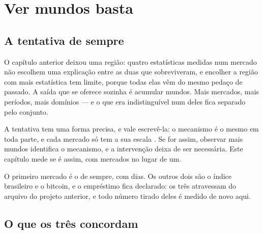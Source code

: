 %
%

\chapter{Ver mundos basta}
\label{cap:observar}

\section{A tentativa de sempre}

O capítulo anterior deixou uma região: quatro estatísticas medidas num mercado não escolhem uma
explicação entre as duas que sobreviveram, e encolher a região com mais estatística tem limite,
porque todas elas vêm do mesmo pedaço de passado. A saída que se oferece sozinha é acumular
mundos. Mais mercados, mais períodos, mais domínios --- e o que era indistinguível num deles fica
separado pelo conjunto.

A tentativa tem uma forma precisa, e vale escrevê-la: o mecanismo é o mesmo em toda parte, e cada
mercado só tem a sua escala \cite{peters2016causal}\cite{scholkopf2021causal}.\cite{ghassami2017learning}\cite{li2025feature}\cite{scholkopf2021causalb} Se for assim, observar mais mundos identifica o mecanismo, e a
intervenção deixa de ser necessária. Este capítulo mede se é assim, com \numObservarMercados{}
mercados no lugar de um.

O primeiro mercado é o de sempre, com \numObservarDiasMaior{} dias. Os outros dois são o índice
brasileiro e o bitcoin, e o empréstimo fica declarado: os três atravessam do arquivo do projeto
anterior, e todo número tirado deles é medido de novo aqui.

\section{O que os três concordam}

